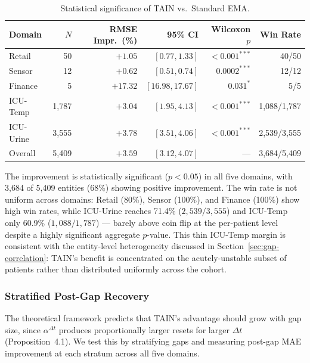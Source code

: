 \documentclass[11pt,a4paper]{article}
\begin{document}
\begin{table}[h]
\centering
\caption{Statistical significance of TAIN vs.\ Standard EMA.}
\label{tab:significance}
\begin{tabular}{lrrrrr}
\toprule
Domain & $N$ & RMSE Impr.\ (\%) & 95\% CI & Wilcoxon $p$ & Win Rate \\
\midrule
Retail  & 50 & $+1.05$ & $[0.77, 1.33]$ & $< 0.001^{***}$ & 40/50 \\
Sensor  & 12 & $+0.62$ & $[0.51, 0.74]$ & $0.0002^{***}$ & 12/12 \\
Finance &  5 & $+17.32$ & $[16.98, 17.67]$ & $0.031^{*}$ & 5/5 \\
ICU-Temp  & 1{,}787 & $+3.04$ & $[1.95, 4.13]$ & $< 0.001^{***}$ & 1{,}088/1{,}787 \\
ICU-Urine & 3{,}555 & $+3.78$ & $[3.51, 4.06]$ & $< 0.001^{***}$ & 2{,}539/3{,}555 \\
\midrule
Overall & 5{,}409 & $+3.59$ & $[3.12, 4.07]$ & --- & 3{,}684/5{,}409 \\
\bottomrule
\end{tabular}
\end{table}

The improvement is statistically significant ($p < 0.05$) in all five domains,
with 3{,}684 of 5{,}409 entities (68\%) showing positive improvement. The win
rate is not uniform across domains: Retail (80\%), Sensor (100\%), and
Finance (100\%) show high win rates, while ICU-Urine reaches 71.4\%
($2{,}539/3{,}555$) and ICU-Temp only 60.9\% ($1{,}088/1{,}787$) --- barely
above coin flip at the per-patient level despite a highly significant aggregate
$p$-value. This thin ICU-Temp margin is consistent with the entity-level
heterogeneity discussed in Section~\ref{sec:gap-correlation}: TAIN's benefit
is concentrated on the acutely-unstable subset of patients rather than
distributed uniformly across the cohort.

\subsubsection{Stratified Post-Gap Recovery}
\label{sec:stratified}

The theoretical framework predicts that TAIN's advantage should grow with gap
size, since $\alpha^{\Delta t}$ produces proportionally larger resets for larger
$\Delta t$ (Proposition~4.1). We test this by stratifying gaps and measuring
post-gap MAE improvement at each stratum across all five domains.
\end{document}
